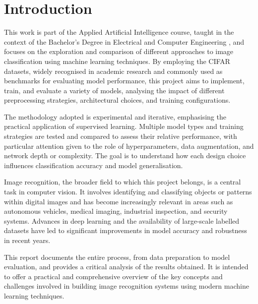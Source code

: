 \documentclass[journal,article,submit,pdftex,moreauthors]{Definitions/mdpi}
\begin{document}


\section{Introduction}

This work is part of the Applied Artificial Intelligence course, taught in the context of the Bachelor’s Degree in Electrical and Computer Engineering , and focuses on the exploration and comparison of different approaches to image classification using machine learning techniques. By employing the CIFAR datasets, widely recognised in academic research and commonly used as benchmarks for evaluating model performance, this project aims to implement, train, and evaluate a variety of models, analysing the impact of different preprocessing strategies, architectural choices, and training configurations.

The methodology adopted is experimental and iterative, emphasising the practical application of supervised learning. Multiple model types and training strategies are tested and compared to assess their relative performance, with particular attention given to the role of hyperparameters, data augmentation, and network depth or complexity. The goal is to understand how each design choice influences classification accuracy and model generalisation.

Image recognition, the broader field to which this project belongs, is a central task in computer vision. It involves identifying and classifying objects or patterns within digital images and has become increasingly relevant in areas such as autonomous vehicles, medical imaging, industrial inspection, and security systems. Advances in deep learning and the availability of large-scale labelled datasets have led to significant improvements in model accuracy and robustness in recent years.

This report documents the entire process, from data preparation to model evaluation, and provides a critical analysis of the results obtained. It is intended to offer a practical and comprehensive overview of the key concepts and challenges involved in building image recognition systems using modern machine learning techniques.

\clearpage
\end{document}
